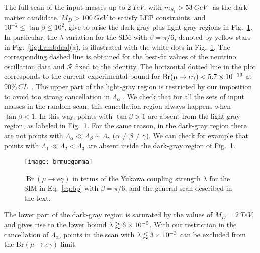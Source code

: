 The full scan of the input masses up to $\SI{2}{TeV}$, with
$m_{S_1}>\SI{53}{GeV}$~\cite{Abe:2014gua} as the dark matter candidate,
$M_D>\SI{100}{GeV}$ to satisfy LEP constraints, and
$10^{-2}\le\tan\beta\le 10^2$, give to arise the dark-gray plus
light-gray regions in Fig.~\ref{fig:brmuegamma}. In particular, the
$\lambda$ variation for the SIM with $\beta=\pi/6$, denoted by yellow
stars in Fig.~\ref{fig:Lambdaa}(a), is illustrated
with the white dots in Fig.~\ref{fig:brmuegamma}.   The
corresponding dashed line is obtained for the best-fit values of the
neutrino oscillation data and $\boldsymbol{\mathcal{R}}$ fixed to the
identity. The horizontal dotted line in the plot corresponds to the
current experimental bound for $\operatorname{Br}(\mu\to e
\gamma)<\num{5.7E-13}$ at $90\%\,\si{CL}$~\cite{Adam:2013mnn}.  
The upper part of the 
light-gray region is restricted by our imposition to avoid too strong
cancellation in  $\Lambda_{\alpha}$ . We check that for all the sets of
input masses in the random scan, this cancellation region always
happens when $\tan\beta<1$. In this way, points with $\tan\beta>1$ are
absent from the light-gray region, as labeled in
Fig.~\ref{fig:brmuegamma}. For the same reason, in the dark-gray
region there are not points with $\Lambda_{\alpha}\ll
\Lambda_{\beta}\sim \Lambda_\gamma$ ($\alpha\ne\beta\ne\gamma$). We can check for example that
points with $\Lambda_1\ll \Lambda_2<\Lambda_3$ are absent inside the
dark-gray region of Fig.~\ref{fig:brmuegamma}.


\begin{figure}
  \centering
  \texttt{[image: brmuegamma]}
  \caption{$\operatorname{Br}(\mu \rightarrow e \gamma)$ in terms of
    the Yukawa coupling strength $\lambda$ for the SIM in
    Eq.~\eqref{eq:bp} with $\beta=\pi/6$, and the general scan
    described in the text.}
  \label{fig:brmuegamma}
\end{figure}



The lower part of the dark-gray region is saturated by the values of
$M_{D}=\SI{2}{TeV}$, and gives rise to the lower bound $\lambda\gtrsim
\num{6E-5}$. 
With our restriction in the cancellation of
$\Lambda_{\alpha}$,  points in the scan with $\lambda\lesssim\num{3E-3}$ 
can be excluded from the Br$(\mu\to e\gamma)$ limit.    









